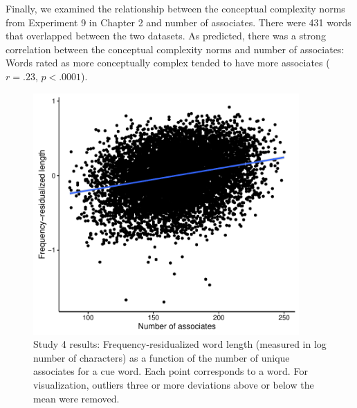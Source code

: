 

Finally, we examined the relationship between the conceptual complexity norms from  Experiment 9 in Chapter 2  and number of associates. There were 431 words that overlapped between the two datasets. As predicted, there was a strong correlation between the conceptual complexity norms and number of associates: Words rated as more conceptually complex tended to have more associates ($r = .23$, $p< .0001$).




  \begin{figure}[t!]
 \begin{center}
  \includegraphics[width=4in]{figs/associate_plot.pdf}
  \caption{\label{fig:associate_plot} Study 4 results: Frequency-residualized word length (measured in log number of characters) as a function of the number of unique associates for a cue word. Each point corresponds to a word. For visualization, outliers three or more deviations above or below the mean were removed.}
 \end{center}
\end{figure} 





